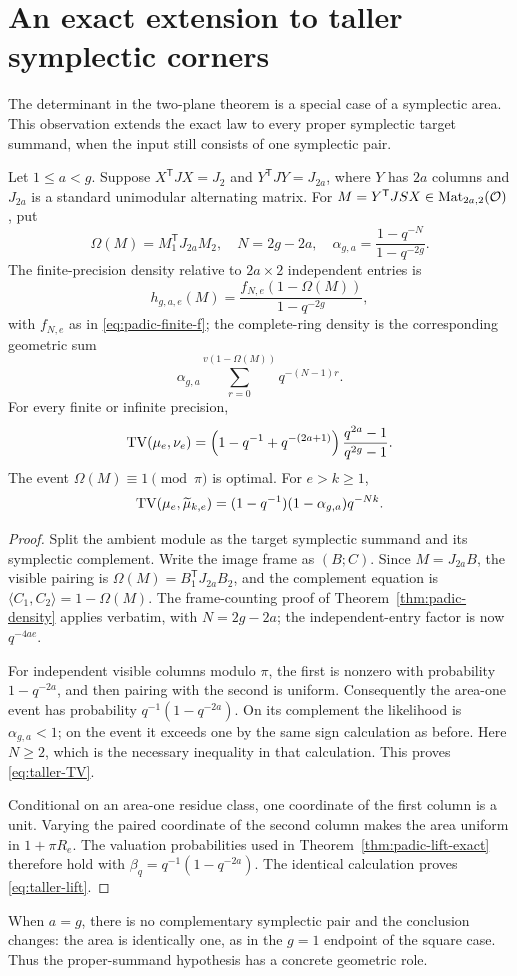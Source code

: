 \section{An exact extension to taller symplectic corners}
\label{sec:taller}

The determinant in the two-plane theorem is a special case of a
symplectic area. This observation extends the exact law to every
proper symplectic target summand, when the input still consists of
one symplectic pair.

\begin{corollary}
\label{cor:taller}
Let $1\le a<g$. Suppose $X^{\mathsf T}JX=J_2$ and
$Y^{\mathsf T}JY=J_{2a}$, where $Y$ has $2a$ columns and $J_{2a}$
is a standard unimodular alternating matrix. For
$M=Y^{\mathsf T}JSX\in\operatorname{Mat}_{2a,2}(\mathcal O)$, put
\[
 \Omega(M)=M_1^{\mathsf T}J_{2a}M_2,\quad
 N=2g-2a,\quad
 \alpha_{g,a}=\frac{1-q^{-N}}{1-q^{-2g}}.
\]
The finite-precision density relative to $2a\times2$ independent entries is
\[
 h_{g,a,e}(M)=\frac{f_{N,e}(1-\Omega(M))}{1-q^{-2g}},
\]
with $f_{N,e}$ as in \eqref{eq:padic-finite-f}; the complete-ring
density is the corresponding geometric sum
\[
 \alpha_{g,a}\sum_{r=0}^{v(1-\Omega(M))}q^{-(N-1)r}.
\]
For every finite or infinite precision,
\begin{equation}\label{eq:taller-TV}
 \operatorname{TV}(\mu_e,\nu_e)
 =\left(1-q^{-1}+q^{-(2a+1)}\right)
   \frac{q^{2a}-1}{q^{2g}-1}.
\end{equation}
The event $\Omega(M)\equiv1\pmod\pi$ is optimal. For $e>k\ge1$,
\begin{equation}\label{eq:taller-lift}
 \operatorname{TV}(\mu_e,\widetilde\mu_{k,e})
 =(1-q^{-1})(1-\alpha_{g,a})q^{-Nk}.
\end{equation}
\end{corollary}

\begin{proof}
Split the ambient module as the target symplectic summand and its
symplectic complement. Write the image frame as $(B;C)$. Since
$M=J_{2a}B$, the visible pairing is
$\Omega(M)=B_1^{\mathsf T}J_{2a}B_2$, and the complement equation is
$\langle C_1,C_2\rangle=1-\Omega(M)$. The frame-counting proof of
Theorem~\ref{thm:padic-density} applies verbatim, with $N=2g-2a$;
the independent-entry factor is now $q^{-4ae}$.

For independent visible columns modulo $\pi$, the first is nonzero
with probability $1-q^{-2a}$, and then pairing with the second is
uniform. Consequently the area-one event has probability
$q^{-1}(1-q^{-2a})$. On its complement the likelihood is
$\alpha_{g,a}<1$; on the event it exceeds one by the same sign
calculation as before. Here $N\ge2$, which is the necessary inequality
in that calculation. This proves \eqref{eq:taller-TV}.

Conditional on an area-one residue class, one coordinate of the first
column is a unit. Varying the paired coordinate of the second column
makes the area uniform in $1+\pi R_e$. The valuation probabilities
used in Theorem~\ref{thm:padic-lift-exact} therefore hold with
$\beta_q=q^{-1}(1-q^{-2a})$. The identical calculation proves
\eqref{eq:taller-lift}.
\end{proof}

When $a=g$, there is no complementary symplectic pair and the
conclusion changes: the area is identically one, as in the $g=1$
endpoint of the square case. Thus the proper-summand hypothesis
has a concrete geometric role.
